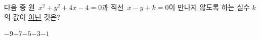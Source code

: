 다음 중 원~$x^2+y^2+4x-4=0$과 직선~$x-y+k=0$이 만나지 않도록 하는 실수 $k$의 값이 \underline{아닌} 것은?
\begin{choices32}{$-9$}{$-7$}{$-5$}{$-3$}{$-1$}\end{choices32}
